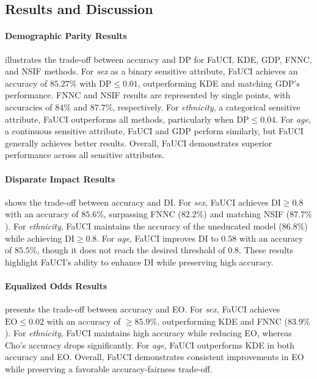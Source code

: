 \subsection{Results and Discussion}\label{subsec:results-fauci}
%

%
%
\paragraph{Demographic Parity Results}
%
 illustrates the trade-off between accuracy and \gls{DP} for \gls{FaUCI}, \gls{KDE}, \gls{GDP}, \gls{FNNC}, and \gls{NSIF} methods.
%
For \emph{sex} as a binary sensitive attribute, \gls{FaUCI} achieves an accuracy of \(85.27\%\) with \(\text{DP} \leq 0.01\), outperforming \gls{KDE} and matching \gls{GDP}'s performance.
%
\gls{FNNC} and \gls{NSIF} results are represented by single points, with accuracies of \(84\%\) and \(87.7\%\), respectively.
%
For \emph{ethnicity}, a categorical sensitive attribute, \gls{FaUCI} outperforms all methods, particularly when \(\text{DP} \leq 0.04\).
%
For \emph{age}, a continuous sensitive attribute, \gls{FaUCI} and \gls{GDP} perform similarly, but \gls{FaUCI} generally achieves better results.
%
Overall, \gls{FaUCI} demonstrates superior performance across all sensitive attributes.

%
\paragraph{Disparate Impact Results}
%
 shows the trade-off between accuracy and \gls{DI}.
%
For \emph{sex}, \gls{FaUCI} achieves \(\text{DI} \geq 0.8\) with an accuracy of \(85.6\%\), surpassing \gls{FNNC} (\(82.2\%\)) and matching \gls{NSIF} (\(87.7\%\)).
%
For \emph{ethnicity}, \gls{FaUCI} maintains the accuracy of the uneducated model (\(86.8\%\)) while achieving \(\text{DI} \geq 0.8\).
%
For \emph{age}, \gls{FaUCI} improves \(\text{DI}\) to \(0.58\) with an accuracy of \(85.5\%\), though it does not reach the desired threshold of \(0.8\).
%
These results highlight \gls{FaUCI}'s ability to enhance \gls{DI} while preserving high accuracy.

%
\paragraph{Equalized Odds Results}
%
 presents the trade-off between accuracy and \gls{EO}.
%
For \emph{sex}, \gls{FaUCI} achieves \(\text{EO} \leq 0.02\) with an accuracy of \(\geq 85.9\%\), outperforming \gls{KDE} and \gls{FNNC} (\(83.9\%\)).
%
For \emph{ethnicity}, \gls{FaUCI} maintains high accuracy while reducing \gls{EO}, whereas Cho's accuracy drops significantly.
%
For \emph{age}, \gls{FaUCI} outperforms \gls{KDE} in both accuracy and \gls{EO}.
%
Overall, \gls{FaUCI} demonstrates consistent improvements in \gls{EO} while preserving a favorable accuracy-fairness trade-off.
